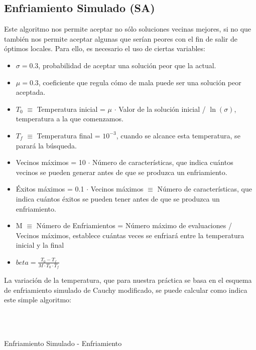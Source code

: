 \documentclass[a4paper, 11pt]{article}
\begin{document}
		\subsection{Enfriamiento Simulado (\textbf{SA})}
			Este algoritmo nos permite aceptar no sólo soluciones vecinas mejores, si no que también nos
			permite aceptar algunas que serían peores con el fin de salir de óptimos locales. Para ello,
			es necesario el uso de ciertas variables:

			\begin{itemize}
				\item $\sigma = 0.3$, probabilidad de aceptar una solución peor que la actual.
				\item $\mu = 0.3$, coeficiente que regula cómo de mala puede ser una solución peor
				aceptada.
				\item $T_0$ $\equiv$ Temperatura inicial = $\mu$ $\cdot$ Valor de la solución inicial / $\ln(\sigma)$,
				temperatura a la que comenzamos.
				\item $T_f$ $ \equiv$ Temperatura final = $10^{-3}$, cuando se alcance esta temperatura, se parará la
				búsqueda.
				\item Vecinos máximos = 10 $\cdot$ Número de características, que indica cuántos vecinos
				se pueden generar antes de que se produzca un enfriamiento.
				\item Éxitos máximos = 0.1 $\cdot$ Vecinos máximos $\equiv$ Número de características,
				que indica cuántos éxitos se pueden tener antes de que se produzca un enfriamiento.
				\item M $\equiv$ Número de Enfriamientos = Número máximo de evaluaciones / Vecinos máximos,
				establece cuántas veces se enfriará entre la temperatura inicial y la final
				\item $\displaystyle beta = \frac{T_0 - T_f}{M \cdot T_0 \cdot T_f}$
			\end{itemize}

			La variación de la temperatura, que para nuestra práctica se basa en el esquema de
			enfriamiento simulado de Cauchy modificado, se puede calcular como indica este simple
			algoritmo:
			
			\begin{algorithm}[H]
				\begin{algorithmic}[1]
					\REQUIRE \ \\
							 \
							 
				\end{algorithmic}
			\caption{Enfriamiento Simulado - Enfriamiento}
			\label{SA-Annealing}
			\end{algorithm}
\end{document}

